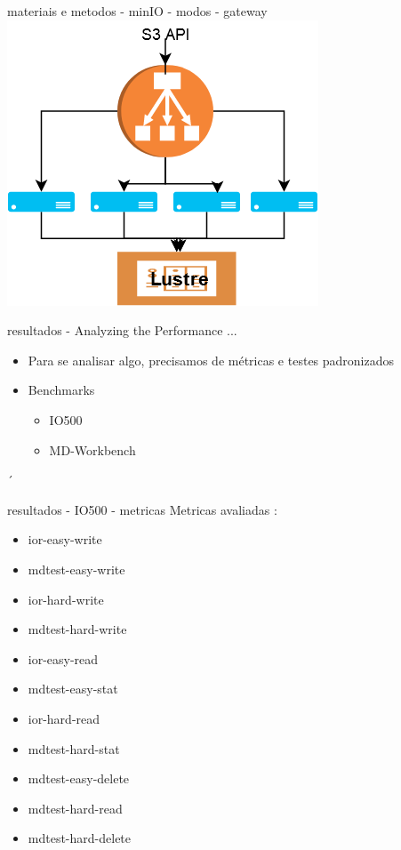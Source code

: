 \documentclass{beamer}
\begin{document}
\begin{frame}{materiais e metodos - minIO - modos - gateway}
    \includegraphics[width=0.6\paperwidth]{presentation/6.png}
\end{frame}
\begin{frame}{resultados - Analyzing the Performance ...}
	\begin{itemize}
		\item Para se analisar algo, precisamos de métricas e testes padronizados
		\pause
		\item Benchmarks
		\begin{itemize}
			\item IO500
			\item MD-Workbench
		\end{itemize}
	\end{itemize}
´\end{frame}

\begin{frame}{resultados - IO500 - metricas}
	Metricas avaliadas : 
		\begin{itemize}
			\item ior-easy-write
			\item mdtest-easy-write
			\item ior-hard-write
			\item mdtest-hard-write
			\item ior-easy-read
			\item mdtest-easy-stat
			\item ior-hard-read
			\item mdtest-hard-stat
			\item mdtest-easy-delete
			\item mdtest-hard-read
			\item mdtest-hard-delete
		\end{itemize}

\end{frame}
\end{document}
